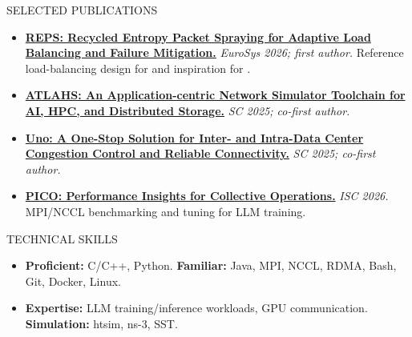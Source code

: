 \documentclass{mcdowellcv}
\begin{document}
\begin{cvsection}{SELECTED PUBLICATIONS}
    \begin{itemize}[itemsep=4pt]
        \item \href{https://doi.org/10.1145/3767295.3769320}{\textbf{REPS: Recycled Entropy Packet Spraying for Adaptive Load Balancing and Failure Mitigation.}}
            \textit{EuroSys 2026; first author.} Reference load-balancing design for  and inspiration for .
        \item \href{https://doi.org/10.1145/3712285.3759838}{\textbf{ATLAHS: An Application-centric Network Simulator Toolchain for AI, HPC, and Distributed Storage.}}
            \textit{SC 2025; co-first author.} 
        \item \href{https://doi.org/10.1145/3712285.3759884}{\textbf{Uno: A One-Stop Solution for Inter- and Intra-Data Center Congestion Control and Reliable Connectivity.}}
            \textit{SC 2025; co-first author.}
        \item \href{https://arxiv.org/abs/2508.16809}{\textbf{PICO: Performance Insights for Collective Operations.}}
            \textit{ISC 2026.}  MPI/NCCL benchmarking and tuning for LLM training.
    \end{itemize}
\end{cvsection}

\begin{cvsection}{TECHNICAL SKILLS}
    \begin{itemize}
        \item \textbf{Proficient:} C/C++, Python. \textbf{Familiar:} Java, MPI, NCCL, RDMA, Bash, Git, Docker, Linux.
        \item \textbf{Expertise:} LLM training/inference workloads, GPU communication. \textbf{Simulation:} htsim, ns-3, SST.
    \end{itemize}
\end{cvsection}
\end{document}
